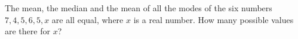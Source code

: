 The mean, the median and the mean of all the modes of the six numbers $7,4,5,6,5,x$ are all equal, where $x$ is a real number. How many possible values are there for $x$?
